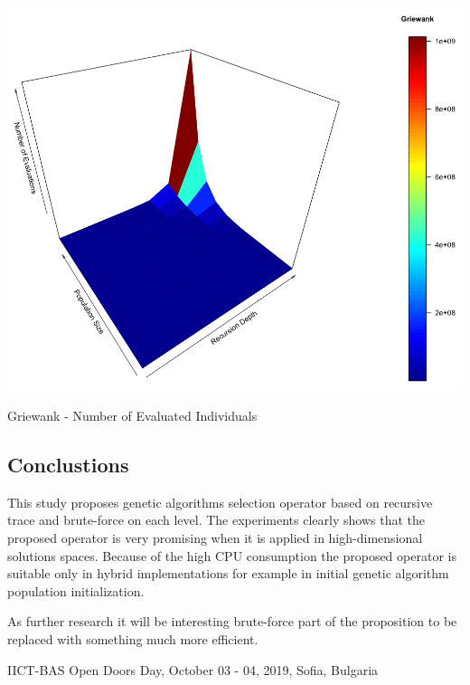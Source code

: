 \documentclass[a0,portrait,25pt]{sciposter}
\begin{document}
\begin{multicols}{3}
\begin{mdframed}[backgroundcolor=white,roundcorner=4pt,shadow=true,linewidth=1pt]
\begin{minipage}[c]{1\linewidth}
\includegraphics[width=0.9\linewidth]{fig08}
\caption{Griewank - Number of Evaluated Individuals}
\end{minipage}

\end{mdframed}

\begin{mdframed}[backgroundcolor=white,roundcorner=4pt,shadow=true,linewidth=1pt] \color{Black}

\section*{Conclustions}
This study proposes genetic algorithms selection operator based on recursive trace and brute-force on each level. The experiments clearly shows that the proposed operator is very promising when it is applied in high-dimensional solutions spaces. Because of the high CPU consumption the proposed operator is suitable only in hybrid implementations for example in initial genetic algorithm population initialization. 

As further research it will be interesting brute-force part of the proposition to be replaced with something much more efficient. 
\end{mdframed}
\end{multicols}

\begin{mdframed}[backgroundcolor=white,roundcorner=4pt,shadow=true,linewidth=1pt]
\color{Black}
IICT-BAS Open Doors Day, October 03 - 04, 2019, Sofia, Bulgaria
\end{mdframed}
\end{document}
